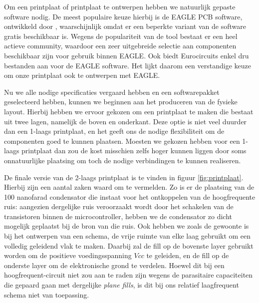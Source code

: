 Om een printplaat of printplaat te ontwerpen hebben we natuurlijk gepaste software nodig. De meest populaire keuze hierbij is de EAGLE PCB software, ontwikkeld door , waarschijnlijk omdat er een beperkte variant van de software gratis beschikbaar is. Wegens de populariteit van de tool bestaat er een heel actieve community, waardoor een zeer uitgebreide selectie aan componenten beschikbaar zijn voor gebruik binnen EAGLE. Ook biedt Eurocircuits enkel \ac{dru} bestanden aan voor de EAGLE software. Het lijkt daarom een verstandige keuze om onze printplaat ook te ontwerpen met EAGLE.

Nu we alle nodige specificaties vergaard hebben en een softwarepakket geselecteerd hebben, kunnen we beginnen aan het produceren van de fysieke layout. Hierbij hebben we ervoor gekozen om een printplaat te maken die bestaat uit twee lagen, namelijk de boven en onderkant. Deze optie is niet veel duurder dan een 1-laags printplaat, en het geeft ons de nodige flexibiliteit om de componenten goed te kunnen plaatsen. Moesten we gekozen hebben voor een 1-laags printplaat dan zou de kost misschien zelfs hoger kunnen liggen door soms onnatuurlijke plaatsing om toch de nodige verbindingen te kunnen realiseren. 

De finale versie van de 2-laags printplaat is te vinden in figuur \ref{fig:printplaat}. Hierbij zijn een aantal zaken waard om te vermelden. Zo is er de plaatsing van de 100 nanofarad condensator die instaat voor het ontkoppelen van de hoogfrequente ruis: aangezien dergelijke ruis veroorzaakt wordt door het schakelen van de transistoren binnen de microcontroller, hebben we de condensator zo dicht mogelijk geplaatst bij de bron van die ruis. Ook hebben we zoals de gewoonte is bij het ontwerpen van een schema, de vrije ruimte van elke laag gebruikt om een volledig geleidend vlak te maken. Daarbij zal de fill op de bovenste layer gebruikt worden om de positieve voedingsspanning $Vcc$ te geleiden, en de fill op de onderste layer om de elektronische grond te verdelen. Hoewel dit bij een hoogfrequent-circuit niet zou aan te raden zijn wegens de parasitaire capaciteiten die gepaard gaan met dergelijke \emph{plane fills}, is dit bij ons relatief laagfrequent schema niet van toepassing.


